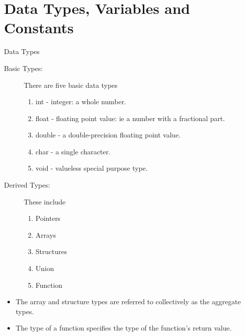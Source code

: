 \documentclass[10pt,t]{beamer}
\begin{document}
\section{Data Types, Variables and Constants}
\begin{frame}{Data Types}
  \begin{description}
    \item[Basic Types:] There are five basic data types
      \begin{enumerate}
        \item int - integer: a whole number.
        \item float - floating point value: ie a number with a fractional part.
        \item double - a double-precision floating point value.
        \item char -  a single character.
        \item void - valueless special purpose type.
      \end{enumerate}
    \item[Derived Types:] These include
      \begin{enumerate}
        \item Pointers
        \item Arrays
        \item Structures
        \item Union
        \item Function
      \end{enumerate}
  \end{description}
  \begin{itemize}
    \item The array and structure types are referred to collectively as the aggregate types. 
    \item The type of a function specifies the type of the function's return value.
  \end{itemize}
\end{frame}
\end{document}

